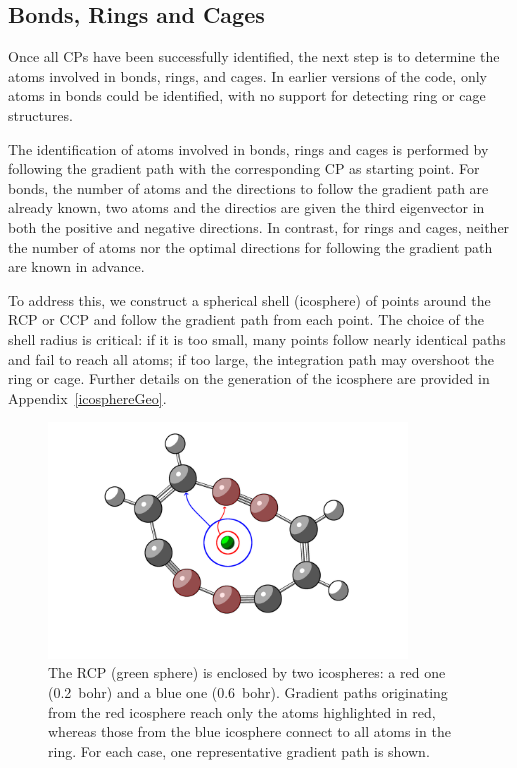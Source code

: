 \newpage
\vspace*{1.5cm}%


\newpage
\subsection{Bonds, Rings and Cages}

Once all \glspl{CP} have been successfully identified, the next step is
to determine the atoms involved in bonds, rings, and cages. In earlier
versions of the code, only atoms in bonds could be identified, with no
support for detecting ring or cage structures.

The identification of atoms involved in bonds, rings and cages is performed by
following the gradient path with the corresponding \gls{CP} as starting point. For bonds, the
number of atoms and the directions to follow the gradient path are already known, two
atoms and the directios are given the third eigenvector in both the positive
and negative directions. In contrast, for rings and cages, neither the number
of atoms nor the optimal directions for following the gradient path are known
in advance.

To address this, we construct a spherical shell (icosphere) of points around
the \gls{RCP} or \gls{CCP} and follow the gradient path from each point. The
choice of the shell radius is critical: if it is too small, many points follow
nearly identical paths and fail to reach all atoms; if too large, the
integration path may overshoot the ring or cage. Further details on the
generation of the icosphere are provided in Appendix~\ref{icosphereGeo}.

\begin{figure}[h!]
  \centering
  \includegraphics[width=0.85\textwidth]{img/c10_cartoon.png}
  \caption{The \gls{RCP} (green sphere) is enclosed by two icospheres: a red
    one (0.2~bohr) and a blue one (0.6~bohr). Gradient paths originating from the
    red icosphere reach only the atoms highlighted in red, whereas those from the
    blue icosphere connect to all atoms in the ring. For each case, one
    representative gradient path is shown.}
  \label{c10}
\end{figure}

